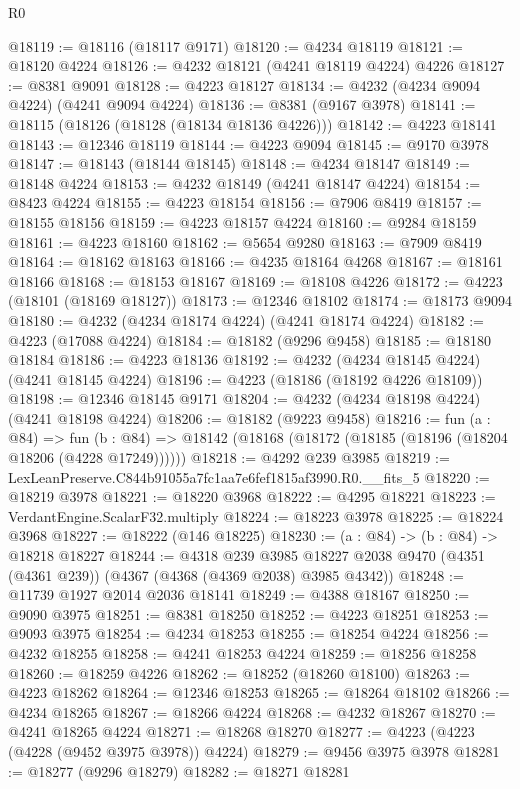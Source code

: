 \begin{lexlean}{R0}
\begin{coremodule}
@18119 := @18116 (@18117 @9171)
@18120 := @4234 @18119
@18121 := @18120 @4224
@18126 := @4232 @18121 (@4241 @18119 @4224) @4226
@18127 := @8381 @9091
@18128 := @4223 @18127
@18134 := @4232 (@4234 @9094 @4224) (@4241 @9094 @4224)
@18136 := @8381 (@9167 @3978)
@18141 := @18115 (@18126 (@18128 (@18134 @18136 @4226)))
@18142 := @4223 @18141
@18143 := @12346 @18119
@18144 := @4223 @9094
@18145 := @9170 @3978
@18147 := @18143 (@18144 @18145)
@18148 := @4234 @18147
@18149 := @18148 @4224
@18153 := @4232 @18149 (@4241 @18147 @4224)
@18154 := @8423 @4224
@18155 := @4223 @18154
@18156 := @7906 @8419
@18157 := @18155 @18156
@18159 := @4223 @18157 @4224
@18160 := @9284 @18159
@18161 := @4223 @18160
@18162 := @5654 @9280
@18163 := @7909 @8419
@18164 := @18162 @18163
@18166 := @4235 @18164 @4268
@18167 := @18161 @18166
@18168 := @18153 @18167
@18169 := @18108 @4226
@18172 := @4223 (@18101 (@18169 @18127))
@18173 := @12346 @18102
@18174 := @18173 @9094
@18180 := @4232 (@4234 @18174 @4224) (@4241 @18174 @4224)
@18182 := @4223 (@17088 @4224)
@18184 := @18182 (@9296 @9458)
@18185 := @18180 @18184
@18186 := @4223 @18136
@18192 := @4232 (@4234 @18145 @4224) (@4241 @18145 @4224)
@18196 := @4223 (@18186 (@18192 @4226 @18109))
@18198 := @12346 @18145 @9171
@18204 := @4232 (@4234 @18198 @4224) (@4241 @18198 @4224)
@18206 := @18182 (@9223 @9458)
@18216 := fun (a : @84) =>
  fun (b : @84) => @18142 (@18168 (@18172 (@18185 (@18196 (@18204 @18206 (@4228 @17249))))))
@18218 := @4292 @239 @3985
@18219 := LexLeanPreserve.C844b91055a7fc1aa7e6fef1815af3990.R0.__fits_5
@18220 := @18219 @3978
@18221 := @18220 @3968
@18222 := @4295 @18221
@18223 := VerdantEngine.ScalarF32.multiply
@18224 := @18223 @3978
@18225 := @18224 @3968
@18227 := @18222 (@146 @18225)
@18230 := (a : @84) -> (b : @84) -> @18218 @18227
@18244 := @4318
    @239
    @3985
    @18227
    @2038
    @9470
    (@4351 (@4361 @239))
    (@4367 (@4368 (@4369 @2038) @3985 @4342))
@18248 := @11739 @1927 @2014 @2036 @18141
@18249 := @4388 @18167
@18250 := @9090 @3975
@18251 := @8381 @18250
@18252 := @4223 @18251
@18253 := @9093 @3975
@18254 := @4234 @18253
@18255 := @18254 @4224
@18256 := @4232 @18255
@18258 := @4241 @18253 @4224
@18259 := @18256 @18258
@18260 := @18259 @4226
@18262 := @18252 (@18260 @18100)
@18263 := @4223 @18262
@18264 := @12346 @18253
@18265 := @18264 @18102
@18266 := @4234 @18265
@18267 := @18266 @4224
@18268 := @4232 @18267
@18270 := @4241 @18265 @4224
@18271 := @18268 @18270
@18277 := @4223 (@4223 (@4228 (@9452 @3975 @3978)) @4224)
@18279 := @9456 @3975 @3978
@18281 := @18277 (@9296 @18279)
@18282 := @18271 @18281

\end{coremodule}
\end{lexlean}
